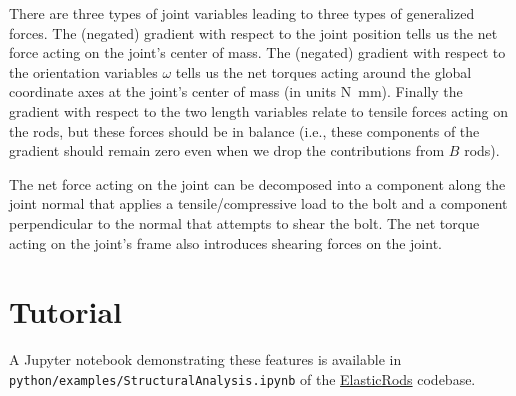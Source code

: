 \documentclass[10pt]{article}
\begin{document}
There are three types of joint variables leading to three types of generalized forces. The (negated) gradient with respect to the joint
position tells us the net force acting on the joint's center of mass. The (negated) gradient with respect to the orientation variables
$\omega$ tells us the net torques acting around the global coordinate axes at the joint's center of mass (in units \si{\newton \milli\meter}).
Finally the gradient with respect to the two length variables relate to tensile forces acting on the rods, but these forces should
be in balance (i.e., these components of the gradient should remain zero even when we drop the contributions from $B$ rods).

The net force acting on the joint can be decomposed into a component along the joint normal that applies a tensile/compressive load
to the bolt and a component perpendicular to the normal that attempts to shear the bolt. The net torque acting on the joint's frame
also introduces shearing forces on the joint.

\section{Tutorial}
A Jupyter notebook demonstrating these features is available in \texttt{python/examples/StructuralAnalysis.ipynb} of the
\href{https://github.com/jpanetta/ElasticRods}{ElasticRods} codebase.
\end{document}
